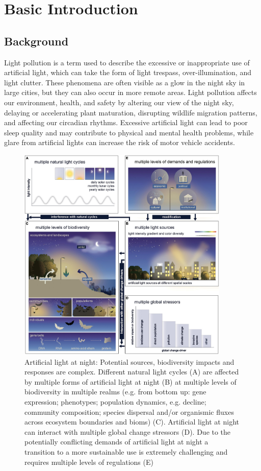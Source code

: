 \MinParskip{}

\section{Basic Introduction}

\subsection{Background}
Light pollution is a term used to describe the excessive or inappropriate use of artificial light, which can take the form of light trespass, over-illumination, and light clutter. These phenomena are often visible as a glow in the night sky in large cities, but they can also occur in more remote areas. Light pollution affects our environment, health, and safety by altering our view of the night sky, delaying or accelerating plant maturation, disrupting wildlife migration patterns, and affecting our circadian rhythms. Excessive artificial light can lead to poor sleep quality and may contribute to physical and mental health problems, while glare from artificial lights can increase the risk of motor vehicle accidents.

\begin{figure}[H]\centering
    \includegraphics[width=0.9\textwidth]{figures/fevo-09-767177-g002.jpg}
    \caption{Artificial light at night: Potential sources, biodiversity impacts and responses are complex. Different natural light cycles (A) are affected by multiple forms of artificial light at night (B) at multiple levels of biodiversity in multiple realms (e.g. from bottom up: gene expression; phenotypes; population dynamics, e.g. decline; community composition; species dispersal and/or organismic fluxes across ecosystem boundaries and bioms) (C). Artificial light at night can interact with multiple global change stressors (D). Due to the potentially conflicting demands of artificial light at night a transition to a more sustainable use is extremely challenging and requires multiple levels of regulations (E) \cite{10.3389/fevo.2021.767177}} \label{fig:figure2}
\end{figure}

